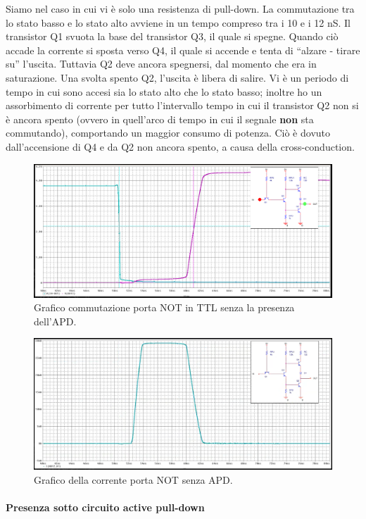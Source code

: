 \documentclass[
]{book}
\begin{document}
Siamo nel caso in cui vi è solo una resistenza di pull-down. La
commutazione tra lo stato basso e lo stato alto avviene in un tempo
compreso tra i 10 e i 12 nS. \newline Il transistor Q1 svuota la base
del transistor Q3, il quale si spegne. Quando ciò accade la corrente si
sposta verso Q4, il quale si accende e tenta di ``alzare - tirare su''
l'uscita. Tuttavia Q2 deve ancora spegnersi, dal momento che era in
saturazione. Una svolta spento Q2, l'uscita è libera di salire. \newline
Vi è un periodo di tempo in cui sono accesi sia lo stato alto che lo
stato basso; inoltre ho un assorbimento di corrente per tutto
l'intervallo tempo in cui il transistor Q2 non si è ancora spento
(ovvero in quell'arco di tempo in cui il segnale \textbf{non} sta
commutando), comportando un maggior consumo di potenza. Ciò è dovuto
dall'accensione di Q4 e da Q2 non ancora spento, a causa della
cross-conduction.

\begin{figure}
\centering
\includegraphics[width=0.6\linewidth,height=\textheight,keepaspectratio]{assets/imgs/commutazione_l_h_no_apd.png}
\caption{Grafico commutazione porta NOT in TTL senza la presenza
dell'APD.}
\end{figure}

\begin{figure}
\centering
\includegraphics[width=0.6\linewidth,height=\textheight,keepaspectratio]{assets/imgs/corrente_no_apd.png}
\caption{Grafico della corrente porta NOT senza APD.}
\end{figure}

\paragraph{Presenza sotto circuito active
pull-down}\label{presenza-sotto-circuito-active-pull-down}
\end{document}
